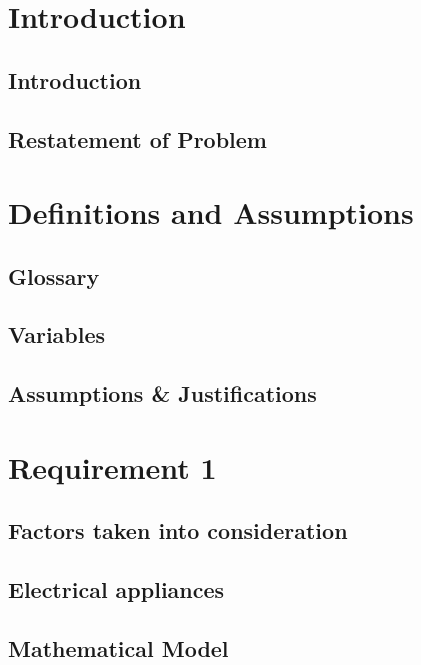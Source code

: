 \documentclass[12pt]{article}
\begin{document}

\pagestyle{fancy}
\fancyhf{}
\setlength{\headheight}{32.09pt}

\tableofcontents
\newpage

\section{Introduction}
\subsection{Introduction}

\subsection{Restatement of Problem}


\section{Definitions and Assumptions}
\subsection{Glossary}

\subsection{Variables}

\subsection{Assumptions \& Justifications}


\section{Requirement 1}
\subsection{Factors taken into consideration}

\subsection{Electrical appliances}

\subsection{Mathematical Model}

\end{document}
